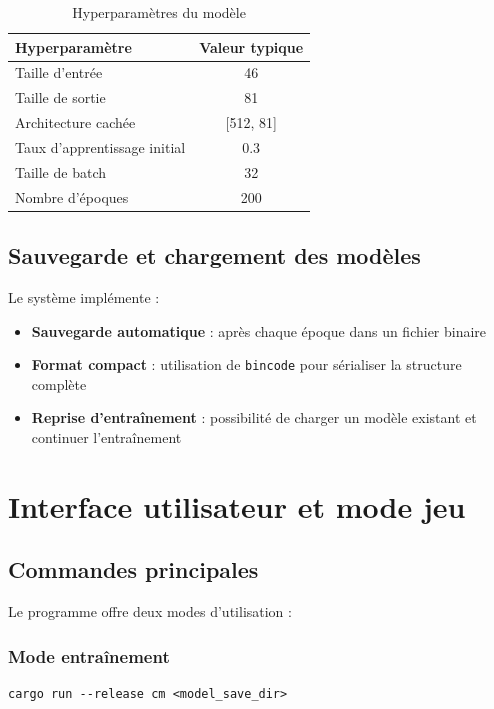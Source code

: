 \documentclass[12pt,a4paper]{report}
\numberwithin{equation}{section}
\begin{document}
\begin{table}[h]
\centering
\begin{tabular}{lc}
\toprule
\textbf{Hyperparamètre} & \textbf{Valeur typique} \\
\midrule
Taille d'entrée & 46 \\
Taille de sortie & 81 \\
Architecture cachée & [512, 81] \\
Taux d'apprentissage initial & 0.3 \\
Taille de batch & 32 \\
Nombre d'époques & 200 \\
\bottomrule
\end{tabular}
\caption{Hyperparamètres du modèle}
\end{table}

\section{Sauvegarde et chargement des modèles}

Le système implémente :
\begin{itemize}
  \item \textbf{Sauvegarde automatique} : après chaque époque dans un fichier binaire
  \item \textbf{Format compact} : utilisation de \texttt{bincode} pour sérialiser la structure complète
  \item \textbf{Reprise d'entraînement} : possibilité de charger un modèle existant et continuer l'entraînement
\end{itemize}

\chapter{Interface utilisateur et mode jeu}

\section{Commandes principales}

Le programme offre deux modes d'utilisation :

\subsection{Mode entraînement}
\begin{verbatim}
cargo run --release cm <model_save_dir>
\end{verbatim}
\end{document}
